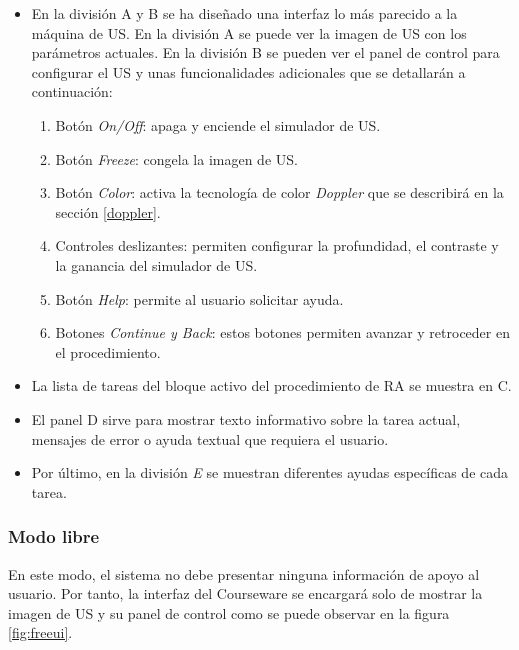 \begin{itemize}
    \item En la división A y B se ha diseñado una interfaz lo más parecido a la máquina de \ac{US}. %
    En la división A se puede ver la imagen de \ac{US} con los parámetros actuales. En la división B se pueden ver el panel de control para configurar el \ac{US} y unas funcionalidades adicionales que se detallarán a continuación:
    \begin{enumerate}
        
        \item Botón \emph{On/Off}: apaga y enciende el simulador de \ac{US}.
        \item Botón \emph{Freeze}: congela la imagen de \ac{US}.
 \item Botón \emph{Color}: activa la tecnología de color \emph{Doppler} que se describirá en la sección \ref{doppler}.
\item Controles deslizantes: permiten configurar la profundidad, el contraste y la ganancia del simulador de \ac{US}.
        \item Botón \emph{Help}: permite al usuario solicitar ayuda.
        \item Botones \emph{Continue y Back}: estos botones permiten avanzar y retroceder en el procedimiento. 
    \end{enumerate}
    \item La lista de tareas del bloque activo del procedimiento de \ac{RA} se muestra en C.
    \item El panel D sirve para mostrar texto informativo sobre la tarea actual, mensajes de error o ayuda textual que requiera el usuario.
    \item Por último, en la división \emph{E} se muestran diferentes ayudas específicas de cada tarea.
\end{itemize}





\subsubsection{Modo libre}

En este modo, el sistema no debe presentar ninguna información de apoyo al usuario. Por tanto, la interfaz del \ac{Courseware} se  encargará solo de mostrar la imagen de \ac{US} y su panel de control como se puede observar en la figura \ref{fig:freeui}.

